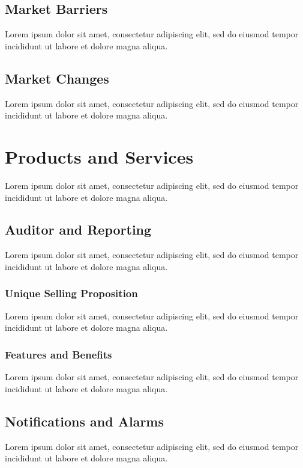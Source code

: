 \subsection{Market Barriers}

Lorem ipsum dolor sit amet, consectetur adipiscing elit, sed do eiusmod tempor incididunt ut labore et dolore magna aliqua.

\subsection{Market Changes}

Lorem ipsum dolor sit amet, consectetur adipiscing elit, sed do eiusmod tempor incididunt ut labore et dolore magna aliqua.


\section{Products and Services}
Lorem ipsum dolor sit amet, consectetur adipiscing elit, sed do eiusmod tempor incididunt ut labore et dolore magna aliqua.


\subsection{Auditor and Reporting}
Lorem ipsum dolor sit amet, consectetur adipiscing elit, sed do eiusmod tempor incididunt ut labore et dolore magna aliqua.

\subsubsection*{Unique Selling Proposition}
Lorem ipsum dolor sit amet, consectetur adipiscing elit, sed do eiusmod tempor incididunt ut labore et dolore magna aliqua.

\subsubsection*{Features and Benefits}
Lorem ipsum dolor sit amet, consectetur adipiscing elit, sed do eiusmod tempor incididunt ut labore et dolore magna aliqua.


\subsection{Notifications and Alarms}
Lorem ipsum dolor sit amet, consectetur adipiscing elit, sed do eiusmod tempor incididunt ut labore et dolore magna aliqua.

